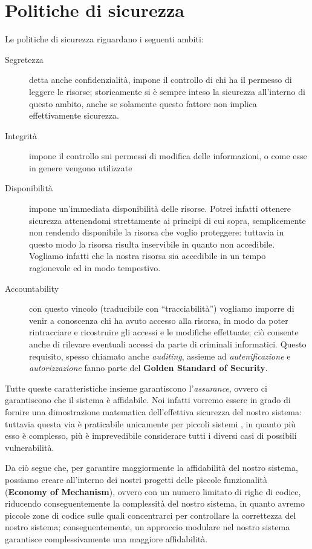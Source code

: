 \section{Politiche di sicurezza}
Le politiche di sicurezza riguardano i seguenti ambiti:
\begin{description}
\item[Segretezza] detta anche confidenzialità, impone il controllo di chi
 	ha il permesso di leggere le risorse; storicamente si è sempre inteso
 	la sicurezza all'interno di questo ambito, anche se solamente questo
 	fattore non implica effettivamente sicurezza.
\item[Integrità] impone il controllo sui permessi di modifica delle informazioni,
	o come esse in genere vengono utilizzate
\item[Disponibilità] impone un'immediata disponibilità delle risorse. Potrei 
	infatti ottenere sicurezza attenendomi strettamente ai principi di cui
	sopra, semplicemente non rendendo disponibile la risorsa che voglio
	proteggere: tuttavia in questo modo la risorsa risulta inservibile
	in quanto non accedibile. Vogliamo infatti che la nostra risorsa sia
	accedibile in un tempo ragionevole ed in modo tempestivo.
\item[Accountability] con questo vincolo (traducibile con ``tracciabilità'')
	vogliamo imporre di venir a conoscenza chi ha avuto accesso alla risorsa,
	in modo da poter rintracciare e ricostruire gli accessi e le modifiche 
	effettuate; ciò consente anche di rilevare eventuali accessi da parte di
	criminali informatici. Questo requisito, spesso chiamato anche \textit{auditing},
	assieme ad \textit{autenificazione} e \textit{autorizzazione} fanno parte del
	\textbf{Golden Standard of Security}.
\end{description}

Tutte queste caratteristiche insieme garantiscono l'\textit{assurance}, ovvero ci
garantiscono che il sistema è affidabile. Noi infatti vorremo essere in grado
di fornire una dimostrazione matematica dell'effettiva sicurezza del nostro
sistema: tuttavia questa via è praticabile unicamente per piccoli sistemi
, in quanto più esso è complesso, più è imprevedibile considerare tutti
i diversi casi di possibili vulnerabilità. 


Da ciò segue che, per garantire maggiormente la
affidabilità del nostro sistema, possiamo creare all'interno dei nostri 
progetti delle piccole funzionalità (\textbf{Economy of Mechanism}), ovvero con un 
numero limitato di righe di codice,
riducendo conseguentemente la complessità del nostro sistema, in quanto
avremo piccole zone di codice sulle quali concentrarci per controllare la 
correttezza del nostro sistema; conseguentemente, un approccio modulare nel
nostro sistema garantisce complessivamente una maggiore affidabilità.
